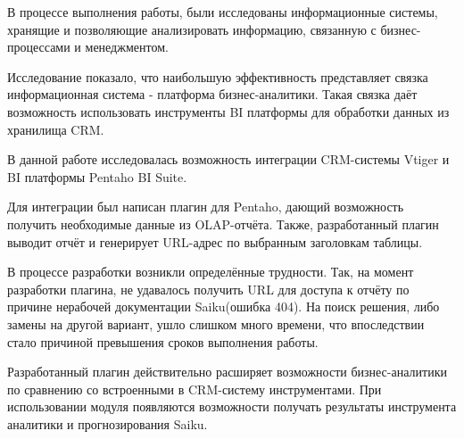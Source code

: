 \conclusion
В процессе выполнения работы, были исследованы информационные системы, хранящие и позволяющие анализировать информацию, связанную с бизнес-процессами и менеджментом.

Исследование показало, что наибольшую эффективность представляет связка информационная система - платформа бизнес-аналитики. Такая связка даёт возможность использовать инструменты BI платформы для обработки данных из хранилища CRM.

В данной работе исследовалась возможность интеграции CRM-системы Vtiger и BI платформы Pentaho BI Suite. 

Для интеграции был написан плагин для Pentaho, дающий возможность получить необходимые данные из OLAP-отчёта. Также, разработанный плагин выводит отчёт и генерирует URL-адрес по выбранным заголовкам таблицы.

В процессе разработки возникли определённые трудности. Так, на момент разработки плагина, не удавалось получить URL для доступа к отчёту по причине нерабочей документации Saiku(ошибка 404). На поиск решения, либо замены на другой вариант, ушло слишком много времени, что впоследствии стало причиной превышения сроков выполнения работы.

Разработанный плагин действительно расширяет возможности бизнес-аналитики по сравнению со встроенными в CRM-систему инструментами. При использовании модуля появляются возможности получать результаты инструмента аналитики и прогнозирования Saiku.

